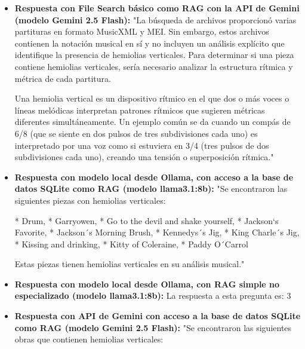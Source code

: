 \begin{itemize}
    \item \textbf{Respuesta con File Search básico como RAG con la API de Gemini (modelo Gemini 2.5 Flash):} "La búsqueda de archivos proporcionó varias partituras en formato MusicXML y MEI. Sin embargo, estos archivos contienen la notación musical en sí y no incluyen un análisis explícito que identifique la presencia de hemiolias verticales. Para determinar si una pieza contiene hemiolias verticales, sería necesario analizar la estructura rítmica y métrica de cada partitura.

Una hemiolia vertical es un dispositivo rítmico en el que dos o más voces o líneas melódicas interpretan patrones rítmicos que sugieren métricas diferentes simultáneamente. Un ejemplo común se da cuando un compás de 6/8 (que se siente en dos pulsos de tres subdivisiones cada uno) es interpretado por una voz como si estuviera en 3/4 (tres pulsos de dos subdivisiones cada uno), creando una tensión o superposición rítmica."
    \item \textbf{Respuesta con modelo local desde Ollama, con acceso a la base de datos SQLite como RAG (modelo llama3.1:8b):} "Se encontraron las siguientes piezas con hemiolias verticales:

* Drum,
* Garryowen,
* Go to the devil and shake yourself,
* Jackson`s Favorite,
* Jackson´s Morning Brush,
* Kennedys´s Jig,
* King Charle´s Jig,
* Kissing and drinking,
* Kitty of Coleraine,
* Paddy O´Carrol

Estas piezas tienen hemiolias verticales en su análisis musical."
    \item \textbf{Respuesta con modelo local desde Ollama, con RAG simple no especializado (modelo llama3.1:8b):} La respuesta a esta pregunta es: 3
    \item \textbf{Respuesta con API de Gemini con acceso a la base de datos SQLite como RAG (modelo Gemini 2.5 Flash):} "Se encontraron las siguientes obras que contienen hemiolias verticales:


\end{itemize}
